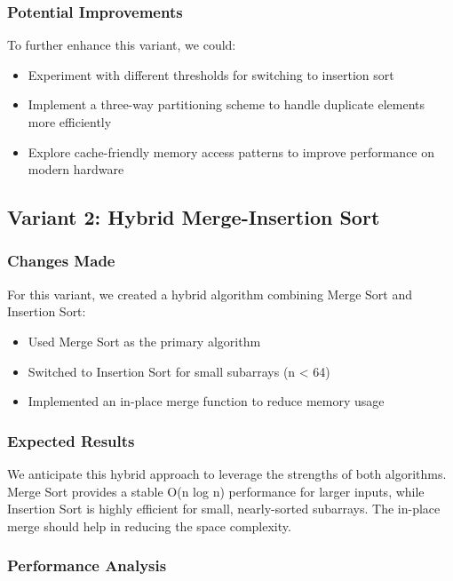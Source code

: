 \documentclass[twocolumn]{article}
\begin{document}
\subsubsection{Potential Improvements}
To further enhance this variant, we could:
\begin{itemize}
    \item Experiment with different thresholds for switching to insertion sort
    \item Implement a three-way partitioning scheme to handle duplicate elements more efficiently
    \item Explore cache-friendly memory access patterns to improve performance on modern hardware
\end{itemize}

\subsection{Variant 2: Hybrid Merge-Insertion Sort}

\subsubsection{Changes Made}
For this variant, we created a hybrid algorithm combining Merge Sort and Insertion Sort:
\begin{itemize}
    \item Used Merge Sort as the primary algorithm
    \item Switched to Insertion Sort for small subarrays (n < 64)
    \item Implemented an in-place merge function to reduce memory usage
\end{itemize}

\subsubsection{Expected Results}
We anticipate this hybrid approach to leverage the strengths of both algorithms. Merge Sort provides a stable O(n log n) performance for larger inputs, while Insertion Sort is highly efficient for small, nearly-sorted subarrays. The in-place merge should help in reducing the space complexity.

\subsubsection{Performance Analysis}
\end{document}
